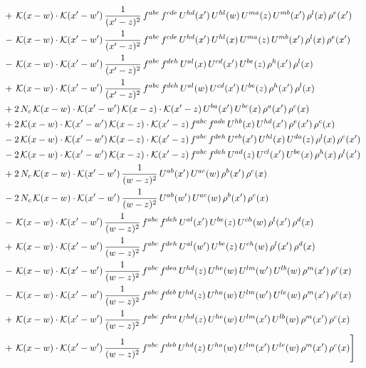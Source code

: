\documentclass[9pt]{article}
\numberwithin{equation}{section}
\begin{document}
\begin{align}
&+\,\mathcal{K}(x-w)\cdot\mathcal{K}(x'-w')\,\frac{1}{(x'-z)^{2}}\,f^{abc}\,f^{cde}\,U^{hd}(x')\,U^{hl}(w)\,U^{ma}(z)\,U^{mb}(x')\,\rho^{l}(x)\,\rho^{e}(x')\notag\\
&-\,\mathcal{K}(x-w)\cdot\mathcal{K}(x'-w')\,\frac{1}{(x'-z)^{2}}\,f^{abc}\,f^{cde}\,U^{hd}(x')\,U^{hl}(x)\,U^{ma}(z)\,U^{mb}(x')\,\rho^{l}(x)\,\rho^{e}(x')\notag\\
&-\,\mathcal{K}(x-w)\cdot\mathcal{K}(x'-w')\,\frac{1}{(x'-z)^{2}}\,f^{abc}\,f^{deh}\,U^{al}(x)\,U^{cd}(x')\,U^{be}(z)\,\rho^{h}(x')\,\rho^{l}(x)\notag\\
&+\,\mathcal{K}(x-w)\cdot\mathcal{K}(x'-w')\,\frac{1}{(x'-z)^{2}}\,f^{abc}\,f^{deh}\,U^{al}(w)\,U^{cd}(x')\,U^{be}(z)\,\rho^{h}(x')\,\rho^{l}(x)\notag\\
&+2\,N_{c}\,\mathcal{K}(x-w)\cdot\mathcal{K}(x'-w')\,\mathcal{K}(x-z)\cdot\mathcal{K}(x'-z)\,U^{ba}(x')\,U^{bc}(x)\,\rho^{a}(x')\,\rho^{c}(x)\notag\\
&+2\,\mathcal{K}(x-w)\cdot\mathcal{K}(x'-w')\,\mathcal{K}(x-z)\cdot\mathcal{K}(x'-z)\,f^{abc}\,f^{ade}\,U^{hb}(x)\,U^{hd}(x')\,\rho^{e}(x')\,\rho^{c}(x)\notag\\
&-2\,\mathcal{K}(x-w)\cdot\mathcal{K}(x'-w')\,\mathcal{K}(x-z)\cdot\mathcal{K}(x'-z)\,f^{abc}\,f^{deh}\,U^{eb}(x')\,U^{hl}(x)\,U^{da}(z)\,\rho^{l}(x)\,\rho^{c}(x')\notag\\
&-2\,\mathcal{K}(x-w)\cdot\mathcal{K}(x'-w')\,\mathcal{K}(x-z)\cdot\mathcal{K}(x'-z)\,f^{abc}\,f^{deh}\,U^{ad}(z)\,U^{cl}(x')\,U^{be}(x)\,\rho^{h}(x)\,\rho^{l}(x')\notag\\
&+2\,N_{c}\,\mathcal{K}(x-w)\cdot\mathcal{K}(x'-w')\,\frac{1}{(w-z)^{2}}\,U^{ab}(x')\,U^{ac}(w)\,\rho^{b}(x')\,\rho^{c}(x)\notag\\
&-2\,N_{c}\,\mathcal{K}(x-w)\cdot\mathcal{K}(x'-w')\,\frac{1}{(w-z)^{2}}\,U^{ab}(w')\,U^{ac}(w)\,\rho^{b}(x')\,\rho^{c}(x)\notag\\
&-\,\mathcal{K}(x-w)\cdot\mathcal{K}(x'-w')\,\frac{1}{(w-z)^{2}}\,f^{abc}\,f^{deh}\,U^{al}(x')\,U^{be}(z)\,U^{ch}(w)\,\rho^{l}(x')\,\rho^{d}(x)\notag\\
&+\,\mathcal{K}(x-w)\cdot\mathcal{K}(x'-w')\,\frac{1}{(w-z)^{2}}\,f^{abc}\,f^{deh}\,U^{al}(w')\,U^{be}(z)\,U^{ch}(w)\,\rho^{l}(x')\,\rho^{d}(x)\notag\\
&-\,\mathcal{K}(x-w)\cdot\mathcal{K}(x'-w')\,\frac{1}{(w-z)^{2}}\,f^{abc}\,f^{dea}\,U^{hd}(z)\,U^{he}(w)\,U^{lm}(w')\,U^{lb}(w)\,\rho^{m}(x')\,\rho^{c}(x)\notag\\
&-\,\mathcal{K}(x-w)\cdot\mathcal{K}(x'-w')\,\frac{1}{(w-z)^{2}}\,f^{abc}\,f^{deb}\,U^{hd}(z)\,U^{ha}(w)\,U^{lm}(w')\,U^{le}(w)\,\rho^{m}(x')\,\rho^{c}(x)\notag\\
&+\,\mathcal{K}(x-w)\cdot\mathcal{K}(x'-w')\,\frac{1}{(w-z)^{2}}\,f^{abc}\,f^{dea}\,U^{hd}(z)\,U^{he}(w)\,U^{lm}(x')\,U^{lb}(w)\,\rho^{m}(x')\,\rho^{c}(x)\notag\\
&+\,\mathcal{K}(x-w)\cdot\mathcal{K}(x'-w')\,\frac{1}{(w-z)^{2}}\,f^{abc}\,f^{deb}\,U^{hd}(z)\,U^{ha}(w)\,U^{lm}(x')\,U^{le}(w)\,\rho^{m}(x')\,\rho^{c}(x)\Bigg]
\end{align}
\end{document}
